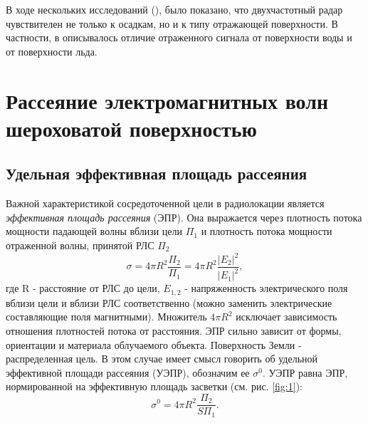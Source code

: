В ходе нескольких исследований (\cite{chu,fre,kar1,masha}), было показано, что двухчастотный радар
чувствителен не только к осадкам, но и к типу отражающей поверхности. В частности, в \cite{kar1} описывалось отличие
отраженного сигнала от поверхности воды и от поверхности льда.


\section{Рассеяние электромагнитных волн шероховатой поверхностью}

\subsection{Удельная эффективная площадь рассеяния} 

Важной характеристикой сосредоточенной цели в радиолокации является \textit{эффективная площадь рассеяния}
(ЭПР)\cite{meln}. Она выражается через плотность потока мощности падающей волны вблизи цели $\Pi_1$ и плотность потока
мощности отраженной волны, принятой РЛС $\Pi_2$
\begin{equation}
  \sigma = 4 \pi R^2 \frac{\Pi_2}{\Pi_1} = 4 \pi R^2 \frac{|E_2|^2}{|E_1|^2},
  \label{eq:1.1}
\end{equation}
где R - расстояние от РЛС до цели, $E_{1,2}$ - напряженность электрического поля вблизи цели и вблизи РЛС соответственно
(можно заменить электрические составляющие поля магнитными). Множитель $4 \pi R^2$  исключает зависимость отношения
плотностей потока от расстояния. ЭПР сильно зависит от формы, ориентации и материала облучаемого объекта. 
Поверхность Земли - распределенная цель. В этом случае имеет смысл говорить об удельной эффективной площади рассеяния
(УЭПР), обозначим ее $\sigma^0$. УЭПР равна ЭПР, нормированной на эффективную площадь засветки (см. рис. \ref{fig:1}):
\begin{equation}
  \sigma^0 = 4 \pi R^2 \frac{\Pi_2}{S\Pi_1}.
  \label{eq:1.2}
\end{equation}

